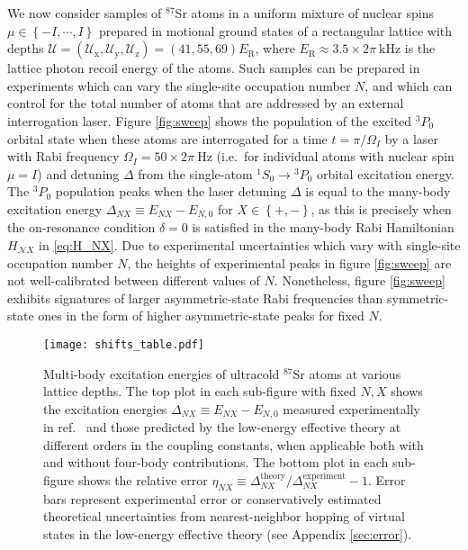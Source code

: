 \documentclass[preprint,showkeys,nofootinbib]{revtex4-1}
\renewcommand{\t}{\text} %
\newcommand{\p}[1]{\left(#1\right)} %
\renewcommand{\set}[1]{\left\{#1\right\}} %
\newcommand{\x}{\text{x}}
\newcommand{\y}{\text{y}}
\newcommand{\z}{\text{z}}
\newcommand{\N}{\mathcal{N}}
\newcommand{\U}{\mathcal{U}}
\newcommand{\1}{\mathds{1}}
\begin{document}
We now consider samples of ${}^{87}$Sr atoms in a uniform mixture of
nuclear spins $\mu\in\set{-I,\cdots,I}$ prepared in motional ground
states of a rectangular lattice with depths
$\U=\p{\U_\x,\U_\y,\U_\z}=\p{41,55,69} E_{\t{R}}$, where
$E_{\t{R}}\approx3.5\times2\pi~\t{kHz}$ is the lattice photon recoil
energy of the atoms.  Such samples can be prepared in experiments
which can vary the single-site occupation number $N$, and which can
control for the total number of atoms that are addressed by an
external interrogation laser.  Figure \ref{fig:sweep} shows the
population of the excited ${}^3P_0$ orbital state when these atoms are
interrogated for a time $t=\pi/\Omega_I$ by a laser with Rabi
frequency $\Omega_I=50\times2\pi~\t{Hz}$ (i.e.~for individual atoms
with nuclear spin $\mu=I$) and detuning $\Delta$ from the single-atom
${}^1S_0\to{}^3P_0$ orbital excitation energy.  The ${}^3P_0$
population peaks when the laser detuning $\Delta$ is equal to the
many-body excitation energy $\Delta_{NX}\equiv E_{NX}-E_{N,0}$ for
$X\in\set{+,-}$, as this is precisely when the on-resonance condition
$\delta=0$ is satisfied in the many-body Rabi Hamiltonian $H_{\N X}$
in \eqref{eq:H_NX}.  Due to experimental uncertainties which vary with
single-site occupation number $N$, the heights of experimental peaks
in figure \ref{fig:sweep} are not well-calibrated between different
values of $N$.  Nonetheless, figure \ref{fig:sweep} exhibits
signatures of larger asymmetric-state Rabi frequencies than
symmetric-state ones in the form of higher asymmetric-state peaks for
fixed $N$.

\begin{figure}
  \centering
  \texttt{[image: shifts\_table.pdf]}
  \caption{\footnotesize Multi-body excitation energies of ultracold
    ${}^{87}$Sr atoms at various lattice depths.  The top plot in each
    sub-figure with fixed $N,X$ shows the excitation energies
    $\Delta_{NX}\equiv E_{NX}-E_{N,0}$ measured experimentally in
    ref.~\cite{goban2018emergence} and those predicted by the
    low-energy effective theory at different orders in the coupling
    constants, when applicable both with and without four-body
    contributions.  The bottom plot in each sub-figure shows the
    relative error
    $\eta_{NX}\equiv
    \Delta_{NX}^{\t{theory}}/\Delta_{NX}^{\t{experiment}}-1$.  Error
    bars represent experimental error or conservatively estimated
    theoretical uncertainties from nearest-neighbor hopping of virtual
    states in the low-energy effective theory (see Appendix
    \ref{sec:error}).}
  \label{fig:shifts}
\end{figure}
\end{document}
